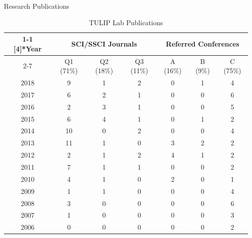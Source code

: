 \documentclass[
 size=14pt,
 paper=smartboard,  %
 mode=present, 		%
 display=slides, 	%
 style=tuliplab,  	%
 pauseslide,
 fleqn,leqno]{powerdot}{}
\begin{document}
\begin{slide}{Research Publications}
{\vspace{1cm}
\begin{table}
\setlength{\abovecaptionskip}{-25pt}
\setlength{\belowcaptionskip}{12pt}
\caption{TULIP Lab Publications}
\fontsize{13pt}{14pt}\selectfont
    \begin{tabular}{c|c c c|c c c}
    \toprule
\cmidrule{1-1}    \multirow{2}[4]{*}{Year} & \multicolumn{3}{c|}{SCI/SSCI Journals} &
\multicolumn{3}{c}{Referred Conferences} \\
\cmidrule{2-7}          & Q1 (71\%) & Q2 (18\%) & Q3 (11\%) & A (16\%) & B (9\%) & C (75\%) \\
    \midrule
    2018  & 9     & 1     & 2     & 0     & 1     & 4 \\
    2017  & 6     & 2     & 1     & 0     & 0     & 6 \\
    2016  & 2     & 3     & 1     & 0     & 0     & 5 \\
    2015  & 6     & 4     & 1     & 0     & 1     & 2 \\
    2014  & 10    & 0     & 2     & 0     & 0     & 4 \\
    2013  & 11    & 1     & 0     & 3     & 2     & 2 \\
    2012  & 2     & 1     & 2     & 4     & 1     & 2 \\
    2011  & 7     & 1     & 1     & 0     & 0     & 2 \\
    2010  & 4     & 1     & 0     & 2     & 0     & 1 \\
    2009  & 1     & 1     & 0     & 0     & 0     & 4 \\
    2008  & 3     & 0     & 0     & 0     & 0     & 6 \\
    2007  & 1     & 0     & 0     & 0     & 0     & 3 \\
    2006  & 0     & 0     & 0     & 0     & 0     & 2 \\
    \bottomrule
    \end{tabular}
\end{table}
}

{\vspace{0.1cm}
\begin{center}
\end{center}}
\end{slide}
\end{document}
